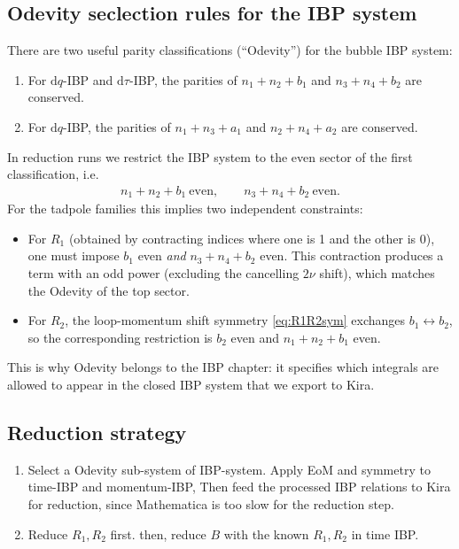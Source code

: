 \documentclass[a4paper,12pt]{article}
\def\di{{\mathrm{d}}}
\begin{document}
\subsection{Odevity seclection rules for the IBP system}
There are two useful parity classifications (``Odevity'') for the bubble IBP system:
\begin{enumerate}
\item For $\di q$-IBP and $\di \tau$-IBP, the parities of $n_1+n_2+b_1$ and $n_3+n_4+b_2$ are conserved.
\item For $\di q$-IBP, the parities of $n_1+n_3+a_1$ and $n_2+n_4+a_2$ are conserved.
\end{enumerate}
In reduction runs we restrict the IBP system to the even sector of the first classification, i.e.
\begin{align}
	n_1+n_2+b_1 \ \text{even},\qquad n_3+n_4+b_2 \ \text{even}. \label{eq:odevity_even_sector}
\end{align}
For the tadpole families this implies two independent constraints:
\begin{itemize}
\item For $R_1$ (obtained by contracting indices where one is 1 and the other is 0), one must impose $b_1$ even \emph{and} $n_3+n_4+b_2$ even. This contraction produces a term with an odd power (excluding the cancelling $2\nu$ shift), which matches the Odevity of the top sector.
\item For $R_2$, the loop-momentum shift symmetry \eqref{eq:R1R2sym} exchanges $b_1\leftrightarrow b_2$, so the corresponding restriction is $b_2$ even and $n_1+n_2+b_1$ even.
\end{itemize}
This is why Odevity belongs to the IBP chapter: it specifies which integrals are allowed to appear in the closed IBP system that we export to Kira.


\subsection{Reduction strategy}
\begin{enumerate}
	\item Select a Odevity sub-system of IBP-system. Apply EoM and symmetry to time-IBP and momentum-IBP, Then feed the processed IBP relations to Kira for reduction, since Mathematica is too slow for the reduction step.
	\item Reduce $R_1,R_2$ first. then, reduce $B$ with the known $R_1,R_2$ in time IBP.
\end{enumerate}
\end{document}
